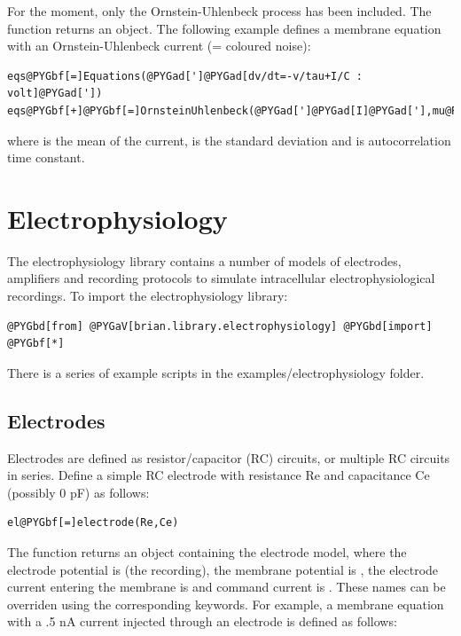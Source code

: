 \documentclass[letterpaper,10pt,english]{manual}
\begin{document}
For the moment, only the Ornstein-Uhlenbeck process has been included.
The function  returns an \hyperlink{brian.Equations}{} object. The following example
defines a membrane equation with an Ornstein-Uhlenbeck current  (= coloured noise):

\begin{Verbatim}[commandchars=@\[\]]
eqs@PYGbf[=]Equations(@PYGad[']@PYGad[dv/dt=-v/tau+I/C : volt]@PYGad['])
eqs@PYGbf[+]@PYGbf[=]OrnsteinUhlenbeck(@PYGad[']@PYGad[I]@PYGad['],mu@PYGbf[=]@PYGaw[1]@PYGbf[*]nA,sigma@PYGbf[=]@PYGaw[2]@PYGbf[*]nA,tau@PYGbf[=]@PYGaw[10]@PYGbf[*]ms)
\end{Verbatim}

where  is the mean of the current,  is the standard deviation and
 is autocorrelation time constant.

\resetcurrentobjects
\hypertarget{--doc-electrophysiology}{}

\section{Electrophysiology}

The electrophysiology library contains a number of models of electrodes,
amplifiers and recording protocols to simulate intracellular electrophysiological
recordings.
To import the electrophysiology library:

\begin{Verbatim}[commandchars=@\[\]]
@PYGbd[from] @PYGaV[brian.library.electrophysiology] @PYGbd[import] @PYGbf[*]
\end{Verbatim}

There is a series of example scripts in the examples/electrophysiology folder.


\subsection{Electrodes}

Electrodes are defined as resistor/capacitor (RC) circuits, or multiple
RC circuits in series. Define a simple RC electrode with resistance Re
and capacitance Ce (possibly 0 pF) as follows:

\begin{Verbatim}[commandchars=@\[\]]
el@PYGbf[=]electrode(Re,Ce)
\end{Verbatim}

The  function returns an \hyperlink{brian.Equations}{} object containing the
electrode model, where
the electrode potential is  (the recording), the membrane potential is , the electrode current
entering the membrane is  and command current is .
These names can be overriden using the corresponding keywords. For example, a membrane
equation with a .5 nA current injected through an electrode is defined as follows:
\end{document}
